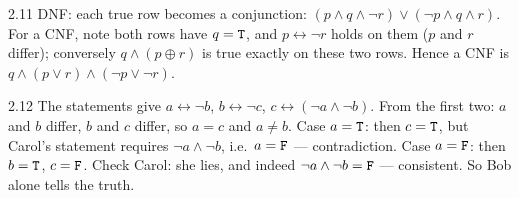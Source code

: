 \begin{solution}{2.11}
DNF: each true row becomes a conjunction:
$(p \wedge q \wedge \neg r) \vee (\neg p \wedge q \wedge r)$.
For a CNF, note both rows have $q = \mathtt{T}$, and $p \leftrightarrow \neg r$ holds
on them ($p$ and $r$ differ); conversely $q \wedge (p \oplus r)$ is true
exactly on these two rows. Hence a CNF is
$q \wedge (p \vee r) \wedge (\neg p \vee \neg r)$.
\end{solution}

\begin{solution}{2.12}
The statements give $a \leftrightarrow \neg b$, $b \leftrightarrow \neg c$,
$c \leftrightarrow (\neg a \wedge \neg b)$. From the first two: $a$ and $b$
differ, $b$ and $c$ differ, so $a = c$ and $a \neq b$. Case $a = \mathtt{T}$: then
$c = \mathtt{T}$, but Carol's statement requires $\neg a \wedge \neg b$, i.e.\
$a = \mathtt{F}$ --- contradiction. Case $a = \mathtt{F}$: then $b = \mathtt{T}$, $c = \mathtt{F}$. Check
Carol: she lies, and indeed $\neg a \wedge \neg b = \mathtt{F}$ --- consistent.
So Bob alone tells the truth.
\end{solution}
